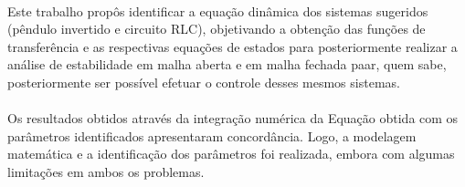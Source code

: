 \documentclass[a4paper, 12pt]{article}
\begin{document}
\paragraph{}
Este trabalho propôs identificar a equação dinâmica dos sistemas sugeridos (pêndulo invertido e circuito RLC), objetivando a obtenção das funções de transferência e as respectivas equações de estados para posteriormente realizar a análise de estabilidade em malha aberta e em malha fechada paar, quem sabe, posteriormente ser possível efetuar o controle desses mesmos sistemas.
\paragraph{}
Os resultados obtidos através da integração numérica da Equação obtida com os parâmetros identificados apresentaram concordância. Logo, a modelagem matemática e a identificação dos parâmetros foi realizada, embora com algumas limitações em ambos os problemas.

\newpage

    \nocite{*}
    
    
\end{document}
